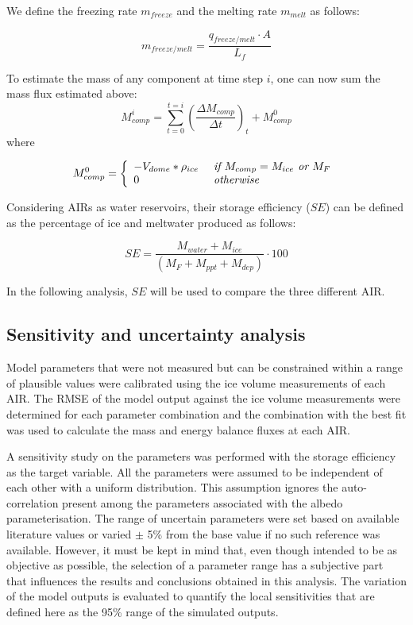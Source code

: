 \documentclass[utf8]{frontiersSCNS} %
\begin{document}
We define the freezing rate $m_{freeze}$ and the melting rate $m_{melt}$ as follows:

\begin{equation}
            m_{freeze/melt} = \frac{q_{freeze/melt} \cdot A }{L_f}
\end{equation}

To estimate the mass of any component at time step $i$, one can now sum the mass flux estimated above:
\begin{equation} M_{comp}^i = \sum_{t=0}^{t=i} (\frac{\Delta M_{comp}}{\Delta t})_{t} + M_{comp}^0 \end{equation}
where 

\begin{equation} M_{comp}^0 = \left\{ \begin{array}{ll} -V_{dome} * \rho_{ice} & \textit{ if } M_{comp}=
        M_{ice}\textit{ or }
M_{F}\\ 0 & \textit{ otherwise }\\ \end{array} \right. \\
 \end{equation}

 Considering AIRs as water reservoirs, their storage efficiency ($SE$) can be defined as the percentage of ice and
 meltwater produced as follows:

\begin{equation} \textit{SE} = \frac{M_{water}+M_{ice}}{(M_F+M_{ppt}+M_{dep})} \cdot 100 \end{equation}

In the following analysis, $SE$ will be used to compare the three different AIR.

\subsection{Sensitivity and uncertainty analysis}
Model parameters that were not measured but can be constrained within a range of plausible values were calibrated using
the ice volume measurements of each AIR. The RMSE of the model output against the ice volume measurements were
determined for each parameter combination and the combination with the best fit was used to calculate the mass and
energy balance fluxes at each AIR. 

A sensitivity study on the parameters was performed with the storage efficiency as the target variable. All the
parameters were assumed to be independent of each other with a uniform distribution. This assumption ignores the auto-correlation present among
the parameters associated with the albedo parameterisation.  The range of uncertain parameters were set based on
available literature values or varied $\pm$ 5\% from the base value if no such reference was available. However, it must be kept in mind that, even though intended to be as objective
as possible, the selection of a parameter range has a subjective part that influences the results and conclusions
obtained in this analysis.  The variation of the model outputs is evaluated to quantify the local sensitivities
that are defined here as the 95\% range of the simulated outputs.
\end{document}
